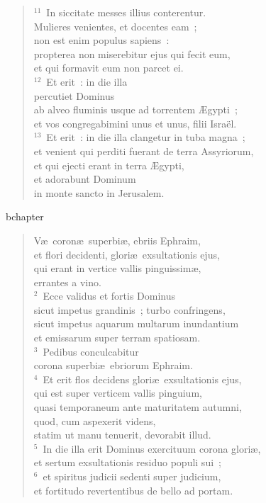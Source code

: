 \begin{verse}
${}^{11}$~In siccitate messes illius conterentur.\\ Mulieres venientes, et docentes eam~;\\ non est enim populus sapiens~:\\ propterea non miserebitur ejus qui fecit eum,\\ et qui formavit eum non parcet ei.\\
${}^{12}$~Et erit~: in die illa\\ percutiet Dominus\\ ab alveo fluminis usque ad torrentem \AE gypti~;\\ et vos congregabimini unus et unus, filii Isra\"el.\\
${}^{13}$~Et erit~: in die illa clangetur in tuba magna~;\\ et venient qui perditi fuerant de terra Assyriorum,\\ et qui ejecti erant in terra \AE gypti,\\ et adorabunt Dominum\\ in monte sancto in Jerusalem.\end{verse}


bchapter\begin{verse}\vspace{-19pt}V\ae\ coron\ae\ superbi\ae , ebriis Ephraim,\\ et flori decidenti, glori\ae\ exsultationis ejus,\\ qui erant in vertice vallis pinguissim\ae ,\\ errantes a vino.\\
${}^{2}$~Ecce validus et fortis Dominus\\ sicut impetus grandinis~; turbo confringens,\\ sicut impetus aquarum multarum inundantium\\ et emissarum super terram spatiosam.\\
${}^{3}$~Pedibus conculcabitur\\ corona superbi\ae\ ebriorum Ephraim.\\
${}^{4}$~Et erit flos decidens glori\ae\ exsultationis ejus,\\ qui est super verticem vallis pinguium,\\ quasi temporaneum ante maturitatem autumni,\\ quod, cum aspexerit videns,\\ statim ut manu tenuerit, devorabit illud.\\
${}^{5}$~In die illa erit Dominus exercituum corona glori\ae ,\\ et sertum exsultationis residuo populi sui~;\\
${}^{6}$~et spiritus judicii sedenti super judicium,\\ et fortitudo revertentibus de bello ad portam.\end{verse}


